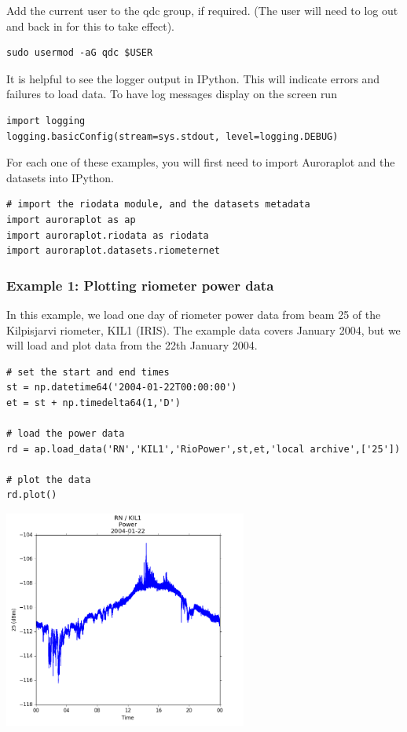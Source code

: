 \documentclass{article}
\begin{document}
Add the current user to the qdc group, if required. (The user will need to log out and back in for this to take effect).

\begin{lstlisting}
sudo usermod -aG qdc $USER
\end{lstlisting}

It is helpful to see the logger output in IPython. This will indicate errors and failures to load data. To have log messages display on the screen run

\begin{lstlisting}[style=pythonstyle]
import logging
logging.basicConfig(stream=sys.stdout, level=logging.DEBUG)
\end{lstlisting}

For each one of these examples, you will first need to import Auroraplot and the datasets into IPython.

\begin{lstlisting}[style=pythonstyle]
# import the riodata module, and the datasets metadata
import auroraplot as ap
import auroraplot.riodata as riodata
import auroraplot.datasets.riometernet
\end{lstlisting}



\subsubsection{Example 1: Plotting riometer power data}

In this example, we load one day of riometer power data from beam 25 of the Kilpisjarvi riometer, KIL1 (IRIS). The example data covers January 2004, but we will load and plot data from the 22th January 2004.

\begin{lstlisting}[style=pythonstyle]
# set the start and end times
st = np.datetime64('2004-01-22T00:00:00')
et = st + np.timedelta64(1,'D')

# load the power data
rd = ap.load_data('RN','KIL1','RioPower',st,et,'local archive',['25'])

# plot the data
rd.plot()
\end{lstlisting}

\includegraphics[width=8cm]{images/figure_1.png}
\end{document}
